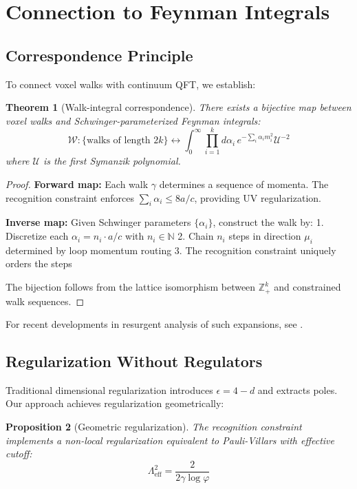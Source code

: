 \documentclass[11pt,a4paper]{article}
\newtheorem{theorem}{Theorem}
\newtheorem{proposition}[theorem]{Proposition}
\theoremstyle{definition}
\theoremstyle{remark}
\begin{document}
\section{Connection to Feynman Integrals}
\label{sec:feynman}

\subsection{Correspondence Principle}

To connect voxel walks with continuum QFT, we establish:

\begin{theorem}[Walk-integral correspondence]
\label{thm:correspondence}
There exists a bijective map between voxel walks and Schwinger-parameterized Feynman integrals:
\[
\mathcal{W}: \{\text{walks of length }2k\} \leftrightarrow \int_0^\infty \prod_{i=1}^k d\alpha_i \, e^{-\sum_i \alpha_i m_i^2} \mathcal{U}^{-2}
\]
where $\mathcal{U}$ is the first Symanzik polynomial.
\end{theorem}

\begin{proof}
\textbf{Forward map:} Each walk $\gamma$ determines a sequence of momenta. The recognition constraint enforces $\sum_i \alpha_i \leq 8a/c$, providing UV regularization.

\textbf{Inverse map:} Given Schwinger parameters $\{\alpha_i\}$, construct the walk by:
1. Discretize each $\alpha_i = n_i \cdot a/c$ with $n_i \in \mathbb{N}$
2. Chain $n_i$ steps in direction $\mu_i$ determined by loop momentum routing
3. The recognition constraint uniquely orders the steps

The bijection follows from the lattice isomorphism between $\mathbb{Z}_+^k$ and constrained walk sequences.
\end{proof}

For recent developments in resurgent analysis of such expansions, see \cite{Aniceto2019,Dorigoni2019}.

\subsection{Regularization Without Regulators}

Traditional dimensional regularization introduces $\epsilon = 4-d$ and extracts poles. Our approach achieves regularization geometrically:

\begin{proposition}[Geometric regularization]
The recognition constraint implements a non-local regularization equivalent to Pauli-Villars with effective cutoff:
\[
\Lambda_{\text{eff}}^2 = \frac{2}{2\gamma\log\varphi}
\]
\end{proposition}
\end{document}

